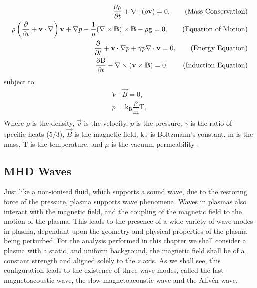 \begin{align}\label{eq:idealmhd}                                                  
    \dfrac{\partial \rho }{\partial t} + \nabla \cdot (\rho \mathbf{v}) = 0,
    \tag{Mass Conservation}\\
    \rho  \left(\frac{\partial}{\partial t} + \mathbf{v}\cdot\nabla\right)\mathbf{v} + \nabla p - \dfrac{1}{\mu}(\nabla \times \mathbf{B}) \times \mathbf{B} - \rho \mathbf{g} = 0,
    \tag{Equation of Motion}\\
    \frac{\partial}{\partial t} + \mathbf{v}\cdot\nabla p + \gamma p \nabla \cdot \mathbf{v}  = 0,
    \tag{Energy Equation}\\
    \dfrac{\partial \mathrm{B}}{\partial t} - \nabla \times (\mathbf{v} \times \mathbf{B}) = 0,
    \tag{Induction Equation}
\end{align}
subject to
\begin{align*}
    \nabla \cdot \vec{B} = 0,
    \tag{Solenoidal Condition}\\
    p = \mathrm{k_B} \dfrac{\rho}{\mathrm{m}} \mathrm{T},
    \tag{Ideal Gas Law}\\                        
\end{align*}
Where $\rho$ is the density, $\vec{v}$ is the velocity, $p$ is the pressure, $\gamma$ is the ratio of specific heats ($5/3$), $\vec{B}$ is the magnetic field, $\mathrm{k_B}$ is Boltzmann's constant, $\mathrm{m}$ is the mass, $\mathrm{T}$ is the temperature, and $\mu$ is the vacuum permeability \citep{goedbloed2004}.


\subsection{MHD Waves}\label{sec:MHDwaves}
Just like a non-ionised fluid, which supports a sound wave, due to the restoring force of the pressure, plasma supports wave phenomena.
Waves in plasmas also interact with the magnetic field, and the coupling of the magnetic field to the motion of the plasma.
This leads to the presence of a wide variety of wave modes in plasma, dependant upon the geometry and physical properties of the plasma being perturbed.
For the analysis performed in this chapter we shall consider a plasma with a static, and uniform background, the magnetic field shall be of a constant strength and aligned solely to the $z$ axis.
As we shall see, this configuration leads to the existence of three wave modes, called the fast-magnetoacoustic wave, the slow-magnetoacoustic wave and the Alfv\'en wave.

